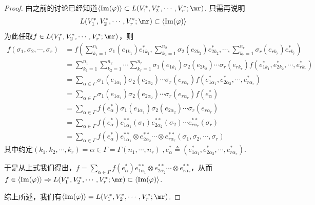 \begin{proof}
	由之前的讨论已经知道$\langle\operatorname{Im}(\varphi) \rangle\subset L(V^{\ast}_{1}, V^{\ast}_{2},\cdots ,V^{\ast}_{r};\mr)$. 只需再说明
	\[
		L(V^{\ast}_{1}, V^{\ast}_{2},\cdots ,V^{\ast}_{r};\mr)\subset \langle\operatorname{Im}(\varphi) \rangle
	\]
	为此任取$f\in L(V^{\ast}_{1},V^{\ast}_{2},\cdots,V^{\ast}_{r};\mr)$，则
	\begin{equation}
	\begin{split}
	f(\sigma_{1},\sigma_{2},\cdots,\sigma_{r})&=f\left(\sum_{k_{1}=1}^{n_{1}}\sigma_{1}(e_{1k_{1}})e^{\ast}_{1k_{1}},\sum_{k_{2}=1}^{n_{2}}\sigma_{2}(e_{2k_{2}})e^{\ast}_{2k_{2}},\cdots,\sum_{k_{r}=1}^{n_{r}}\sigma_{r}(e_{rk_{r}})e^{\ast}_{rk_{r}} \right)\\
	&=\sum_{k_{1}=1}^{n_{1}}\sum_{k_{2}=1}^{n_{2}}\cdots\sum_{k_{r}=1}^{n_{r}}\sigma_{1}(e_{1k_{1}})\sigma_{2}(e_{2k_{2}})\cdots \sigma_{r}(e_{rk_{r}})f\left(e^{\ast}_{1k_{1}},e^{\ast}_{2k_{2}},\cdots,e^{\ast}_{rk_{r}} \right)\\
	&=\sum_{ \alpha\in \Gamma }\sigma_{1}(e_{1\alpha_{1}})\sigma_{2}(e_{2\alpha_{2}})\cdots \sigma_{r}(e_{r\alpha_{r}})f\left(e^{\ast}_{1\alpha_{1}},e^{\ast}_{2\alpha_{2}},\cdots,e^{\ast}_{r\alpha_{r}} \right)\\
	&=\sum_{ \alpha\in \Gamma }\sigma_{1}(e_{1\alpha_{1}})\sigma_{2}(e_{2\alpha_{2}})\cdots \sigma_{r}(e_{r\alpha_{r}})f(e^{\ast}_{\alpha})\\
	&=\sum_{ \alpha\in \Gamma }f(e^{\ast}_{\alpha})\sigma_{1}(e_{1\alpha_{1}})\sigma_{2}(e_{2\alpha_{2}})\cdots \sigma_{r}(e_{r\alpha_{r}})\\
	&=\sum_{ \alpha\in \Gamma }f(e^{\ast}_{\alpha})e^{\ast\ast}_{1\alpha_{1}}(\sigma_{1})e^{\ast\ast}_{2\alpha_{2}}(\sigma_{2})\cdots e^{\ast\ast}_{r\alpha_{r}}(\sigma_{r})\\
	&=\sum_{ \alpha\in \Gamma }f(e^{\ast}_{\alpha})e^{\ast\ast}_{1\alpha_{1}}\otimes e^{\ast\ast}_{2\alpha_{2}}\cdots \otimes e^{\ast\ast}_{r\alpha_{r}}\left( \sigma_{1},\sigma_{2},\cdots,\sigma_{r}\right)
	\end{split}
	\end{equation}
	其中约定$(k_{1},k_{2},\cdots,k_{r})=\alpha\in \Gamma=\Gamma(n_{1},\cdots,n_{r})\;,e^{\ast}_{\alpha}\triangleq \left(e^{\ast}_{1\alpha_{1}},e^{\ast}_{2\alpha_{2}},\cdots,e^{\ast}_{r\alpha_{r}} \right)$. 
	
	于是从上式我们得出，$f=\sum_{ \alpha\in \Gamma }f(e^{\ast}_{\alpha})e^{\ast\ast}_{1\alpha_{1}}\otimes e^{\ast\ast}_{2\alpha_{2}}\cdots \otimes e^{\ast\ast}_{r\alpha_{r}}$，从而$f\in \langle\operatorname{Im}(\varphi) \rangle\Rightarrow L(V^{\ast}_{1}, V^{\ast}_{2},\cdots ,V^{\ast}_{r};\mr)\subset \langle\operatorname{Im}(\varphi) \rangle$.
	
	综上所述，我们有$\langle\operatorname{Im}(\varphi) \rangle=L(V^{\ast}_{1}, V^{\ast}_{2},\cdots ,V^{\ast}_{r};\mr)$.
\end{proof}

